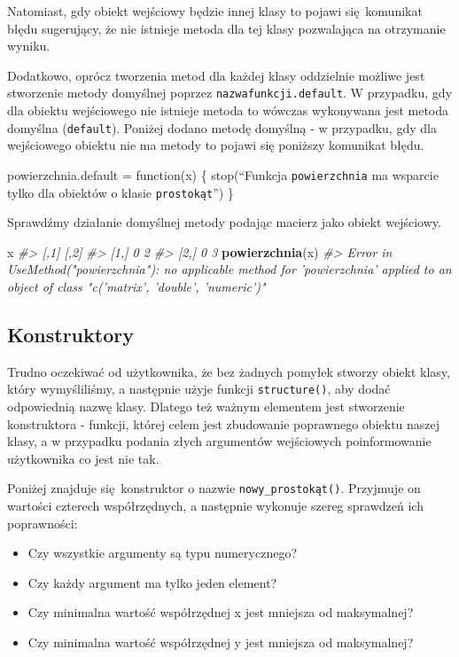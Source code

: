 \documentclass[paper=6in:9in,pagesize=pdftex,headinclude=on,footinclude=on,10pt]{scrbook}
\newenvironment{Shaded}{\begin{snugshade}}{\end{snugshade}}
\newcommand{\CommentTok}[1]{\textcolor[rgb]{0.56,0.35,0.01}{\textit{#1}}}
\newcommand{\KeywordTok}[1]{\textcolor[rgb]{0.13,0.29,0.53}{\textbf{#1}}}
\newcommand{\NormalTok}[1]{#1}
\providecommand{\tightlist}{%
  \setlength{\itemsep}{0pt}\setlength{\parskip}{0pt}}
\let\BeginKnitrBlock\begin \let\EndKnitrBlock\end
\begin{document}
Natomiast, gdy obiekt wejściowy będzie innej klasy to pojawi się~komunikat błędu sugerujący, że nie istnieje metoda dla tej klasy pozwalająca na otrzymanie wyniku.

Dodatkowo, oprócz tworzenia metod dla każdej klasy oddzielnie możliwe jest stworzenie metody domyślnej poprzez \texttt{nazwafunkcji.default}.
W przypadku, gdy dla obiektu wejściowego nie istnieje metoda to wówczas wykonywana jest metoda domyślna (\texttt{default}).
Poniżej dodano metodę domyślną - w przypadku, gdy dla wejściowego obiektu nie ma metody to pojawi się poniższy komunikat błędu.

\BeginKnitrBlock{rmdinfo}
powierzchnia.default = function(x) \{
stop(``Funkcja \texttt{powierzchnia} ma wsparcie tylko dla obiektów o klasie \texttt{prostokąt}'')
\}
\EndKnitrBlock{rmdinfo}

Sprawdźmy działanie domyślnej metody podając macierz jako obiekt wejściowy.

\begin{Shaded}
\begin{Highlighting}[]
\NormalTok{x}
\CommentTok{#>      [,1] [,2]}
\CommentTok{#> [1,]    0    2}
\CommentTok{#> [2,]    0    3}
\KeywordTok{powierzchnia}\NormalTok{(x)}
\CommentTok{#> Error in UseMethod("powierzchnia"): no applicable method for 'powierzchnia' applied to an object of class "c('matrix', 'double', 'numeric')"}
\end{Highlighting}
\end{Shaded}

\hypertarget{konstruktory}{%
\subsection{Konstruktory}\label{konstruktory}}

Trudno oczekiwać od użytkownika, że bez żadnych pomyłek stworzy obiekt klasy, który wymyśliliśmy, a następnie użyje funkcji \texttt{structure()}, aby dodać odpowiednią nazwę klasy.
Dlatego też ważnym elementem jest stworzenie konstruktora - funkcji, której celem jest zbudowanie poprawnego obiektu naszej klasy, a w przypadku podania złych argumentów wejściowych poinformowanie użytkownika co jest nie tak.

Poniżej znajduje się~konstruktor o nazwie \texttt{nowy\_prostokąt()}. Przyjmuje on wartości czterech współrzędnych, a następnie wykonuje szereg sprawdzeń ich poprawności:

\begin{itemize}
\tightlist
\item
  Czy wszystkie argumenty są typu numerycznego?
\item
  Czy każdy argument ma tylko jeden element?
\item
  Czy minimalna wartość współrzędnej x jest mniejsza od maksymalnej?
\item
  Czy minimalna wartość współrzędnej y jest mniejsza od maksymalnej?
\end{itemize}
\end{document}

